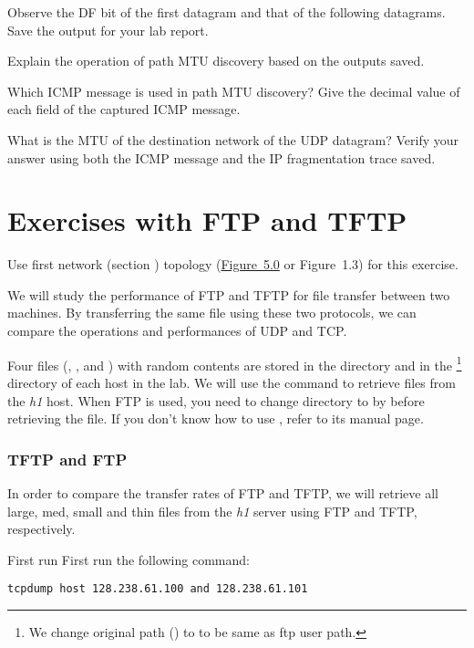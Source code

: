 \documentclass{../UTNetLab}
\begin{document}
Observe the DF bit of the first datagram and that of the following datagrams.
Save the  output for your lab report.

\begin{report}
    \item Explain the operation of path MTU discovery based on the  outputs saved.

    \item Which ICMP message is used in path MTU discovery? Give the decimal value of each field of the captured ICMP message.

    \item What is the MTU of the destination network of the UDP datagram? Verify your answer using both the ICMP message and the IP fragmentation trace saved.
\end{report}

\part{Exercises with FTP and TFTP}
Use first network (section ) topology (\hyperref[fig:5.0]{Figure~5.0} or Figure~1.3) for this exercise.

We will study the performance of FTP and TFTP for file transfer between two machines.
By transferring the same file using these two protocols, we can compare the operations and performances of UDP and TCP.

Four files (, ,  and ) with random contents are stored in the  directory and in the \footnote{We change original path () to  to be same as ftp user path.} directory of each host in the lab.
We will use the  command to retrieve files from the \textit{h1} host.
When FTP is used, you need to change directory to  by  before retrieving the file.
If you don’t know how to use , refer to its manual page.


\section{TFTP and FTP}
In order to compare the transfer rates of FTP and TFTP, we will retrieve all large, med, small and thin files from the \textit{h1} server using FTP and TFTP, respectively.

First run First run the following  command:
\begin{lstlisting}[emph={h0,h1,netlab},morekeywords={[3]host,and}]
tcpdump host 128.238.61.100 and 128.238.61.101
    \end{lstlisting}
\end{document}
